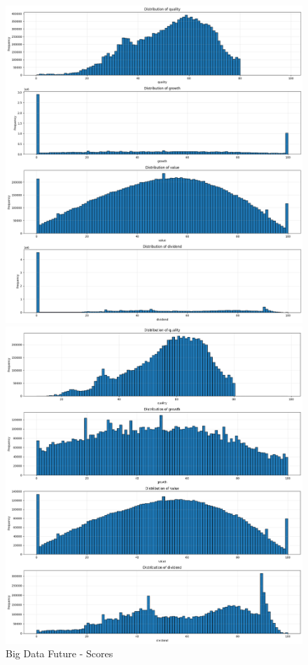 \documentclass[11pt,english,a4paper,hidelinks]{book}
\begin{document}
\begin{figure}[H]
    \centering
    \begin{minipage}{0.48\textwidth}
        \centering
        \includegraphics[width=\linewidth]{images/code/descriptive analysis/distributions/Big Data future - Scores.png}
        \caption{Big Data Future - Scores}
        \label{fig:scores}
    \end{minipage}\hfill
    \begin{minipage}{0.48\textwidth}
        \centering
        \includegraphics[width=\linewidth]{images/code/descriptive analysis/distributions/Big Data future - Scores Deep.png}

\end{minipage}
\end{figure}
\end{document}
